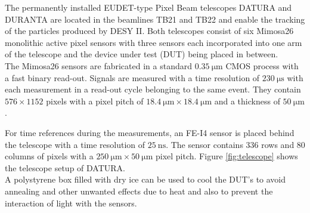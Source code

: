 The permanently installed EUDET-type Pixel Beam telescopes DATURA and DURANTA are located in the beamlines TB21 and TB22 and enable the tracking of the particles
produced by DESY II. Both telescopes consist of six Mimosa26 monolithic active pixel sensors \cite{mimosa26} with %
three sensors each incorporated into one arm of the telescope and the device under test (DUT) being placed in between. \\
The Mimosa26 sensors are fabricated in a standard $\SI{0.35}{\micro\meter}$ CMOS process with a fast binary read-out.
Signals are measured with a time resolution of $\SI{230}{\micro\second}$ with each measurement in a read-out cycle belonging to the same event.
They contain $576 \times 1152$ pixels with a pixel pitch of $\SI{18.4}{\micro\meter} \times \SI{18.4}{\micro\meter}$
and a thickness of $\SI{50}{\micro\meter}$.

For time references during the measurements, an FE-I4 sensor \cite{fei4} is placed behind the telescope with a
time resolution of $\SI{25}{\nano\second}$. The sensor contains 336 rows and 80 columns of pixels with a
$\SI{250}{\micro\meter} \times \SI{50}{\micro\meter}$ pixel pitch. Figure \ref{fig:telescope} shows the telescope setup of DATURA. \\
A polystyrene box filled with dry ice can be used to cool the DUT's to
avoid annealing and other unwanted effects due to heat and also to prevent the interaction of light with the sensors.


